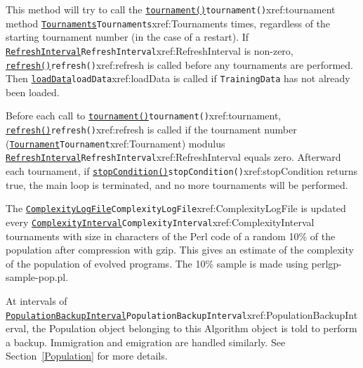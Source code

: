 \documentclass[a4paper]{article}
\begin{document}
This method will try to call the \hyperref[no]{\texttt{tournament()}}{\texttt{tournament()}}{xref:tournament} method
\hyperref[no]{\texttt{Tournaments}}{\texttt{Tournaments}}{xref:Tournaments} times, regardless of the starting tournament
number (in the case of a restart).  If \hyperref[no]{\texttt{RefreshInterval}}{\texttt{RefreshInterval}}{xref:RefreshInterval} is
non-zero, \hyperref[no]{\texttt{refresh()}}{\texttt{refresh()}}{xref:refresh} is called before any tournaments are
performed.  Then \hyperref[no]{\texttt{loadData}}{\texttt{loadData}}{xref:loadData} is called if \texttt{TrainingData}
has not already been loaded.

Before each call to \hyperref[no]{\texttt{tournament()}}{\texttt{tournament()}}{xref:tournament}, \hyperref[no]{\texttt{refresh()}}{\texttt{refresh()}}{xref:refresh} is
called if the tournament number (\hyperref[no]{\texttt{Tournament}}{\texttt{Tournament}}{xref:Tournament}) modulus
\hyperref[no]{\texttt{RefreshInterval}}{\texttt{RefreshInterval}}{xref:RefreshInterval} equals zero.  Afterward each tournament, if
\hyperref[no]{\texttt{stopCondition()}}{\texttt{stopCondition()}}{xref:stopCondition} returns true, the main loop is terminated,
and no more tournaments will be performed.

The \hyperref[no]{\texttt{ComplexityLogFile}}{\texttt{ComplexityLogFile}}{xref:ComplexityLogFile} is updated every
\hyperref[no]{\texttt{ComplexityInterval}}{\texttt{ComplexityInterval}}{xref:ComplexityInterval} tournaments with size in characters of the
Perl code of a random 10\% of the population after compression with
gzip.  This gives an estimate of the complexity of the population of
evolved programs.  The 10\% sample is made using perlgp-sample-pop.pl.

At intervals of \hyperref[no]{\texttt{PopulationBackupInterval}}{\texttt{PopulationBackupInterval}}{xref:PopulationBackupInterval}, the
Population object belonging to this Algorithm object is told
to perform a backup.  Immigration and emigration are handled
similarly.  See Section~\ref{Population} for more details.
\end{document}
